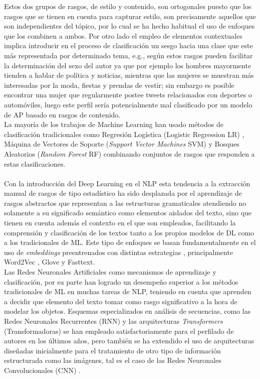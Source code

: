 Estos dos grupos de rasgos, de estilo y contenido, son ortogonales puesto que los rasgos que se tienen en cuenta para capturar estilo, son precisamente aquellos que son independientes del tópico, por lo cual se ha hecho habitual el uso de enfoques que los combinen a ambos. Por otro lado el empleo de elementos contextuales implica introducir en el proceso de clasificación un sesgo hacia una clase que este más representada por determinado tema, e.g., según \citep{schler2006effects} estos rasgos pueden facilitar la determinación del sexo del autor ya que por ejemplo los hombres mayormente tienden a hablar de política y noticias, mientras que las mujeres se muestran más interesadas por la moda, fiestas y prendas de vestir; sin embargo es posible encontrar una mujer que regularmente postee tweets relacionados con deportes o automóviles, luego este perfil sería potencialmente mal clasificado por un modelo de AP basado en rasgos de contenido.
\\
La mayoría de los trabajos de Machine Learning han usado métodos de clasificación tradicionales como Regresión Logística (Logistic Regression LR) \citep{DBLP:conf/clef/Valencia-Valencia19}, Máquina de Vectores de Soporte (\textit{Support Vector Machines} SVM) \citep{DBLP:conf/clef/Pizarro19}  y Bosques Aleatorios (\textit{Random Forest} RF) \citep{DBLP:conf/clef/Johansson19} combinando conjuntos de rasgos que responden a estas clasificaciones.
\\
\\
 Con la introducción del Deep Learning en el NLP esta tendencia a la extracción manual de rasgos de tipo estadístico ha sido desplazada por el aprendizaje de rasgos abstractos que representan a las estructuras gramaticales atendiendo no solamente a su significado semántico como elementos aislados del texto, sino que tienen en cuenta además el contexto en el que son empleados, facilitando la comprensión y clasificación de los textos tanto a los propios modelos de DL como a los tradicionales de ML. Este tipo de enfoques se basan fundamentalmente en el uso de \textit{embeddings} preentrenados con distintas estrategias \citep{DBLP:conf/clef/JooH19,DBLP:conf/clef/Lopez-Santillan19}, principalmente Word2Vec \citep{DBLP:conf/nips/MikolovSCCD13}, Glove\citep{pennington2014glove} y Fasttext\citep{bojanowski2016enriching}.
 \\
 Las Redes Neuronales Artificiales como mecanismos de aprendizaje y clasificación, por su parte han logrado un desempeño superior a los métodos tradicionales de ML en muchas tareas de NLP, teniendo en cuenta que aprenden a decidir que elemento del texto tomar como rasgo significativo a la hora de modelar los objetos. Esquemas especializados en análisis de secuencias, como las Redes Neuronales Recurrentes (RNN) \citep{DBLP:conf/clef/DiasP19,bakhteev:2020} y las arquitecturas \textit{Transformers} (Transformadoras) \citep{iyer:2020,baruah:2020} se han empleado satisfactoriamente para el perfilado de autores en los últimos años, pero también se ha extendido el uso de arquitecturas diseñadas inicialmente para el tratamiento de otro tipo de información estructurada como las imágenes, tal es el caso de las Redes Neuronales Convolucionales (CNN) \citep{DBLP:conf/clef/PetrikC19,DBLP:conf/clef/Lopez-Santillan19}.
